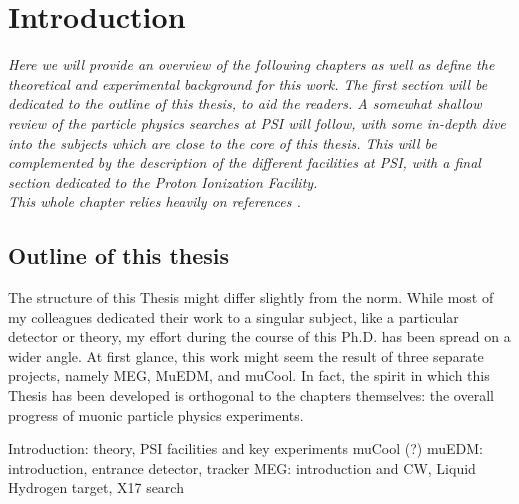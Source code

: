 \chapter{Introduction}

\begin{refsection}

{\itshape
Here we will provide an overview of the following chapters as well as define the theoretical and experimental background for this work. 
The first section will be dedicated to the outline of this thesis, to aid the readers. 
A somewhat shallow review of the particle physics searches at PSI will follow, with some in-depth dive into the subjects which are close to the core of this thesis. 
This will be complemented by the description of the different facilities at PSI, with a final section dedicated to the Proton Ionization Facility.\\ 
This whole chapter relies heavily on references \cite{Signorelli} \cite{PSI:review:2021}.}

\section{Outline of this thesis}
    The structure of this Thesis might differ slightly from the norm. 
    While most of my colleagues dedicated their work to a singular subject, like a particular detector or theory, my effort during the course of this Ph.D. has been spread on a wider angle.
    At first glance, this work might seem the result of three separate projects, namely MEG, MuEDM, and muCool. 
    In fact, the spirit in which this Thesis has been developed is orthogonal to the chapters themselves: the overall progress of muonic particle physics experiments.

    \begin{outline}
        \1 Introduction: theory, PSI facilities and key experiments
        \1 muCool (?)
        \1 muEDM: introduction, entrance detector, tracker
        \1 MEG: introduction and CW, Liquid Hydrogen target, X17 search
    \end{outline}


\end{refsection}

